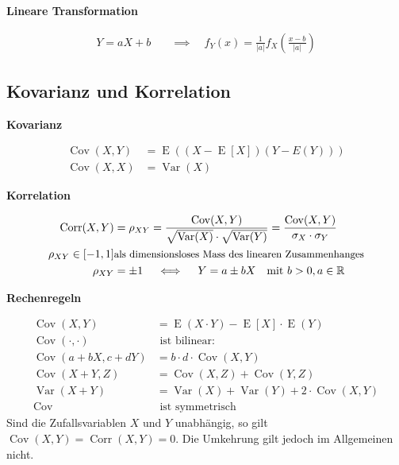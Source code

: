 \documentclass[25pt]{sciposter}
\newcommand{\R}{\mathbb{R}}
\newcommand{\Var}{\operatorname{Var}}
\newcommand{\E}{\operatorname{E}}
\newenvironment{method}[1]{\begin{mdframed}[backgroundcolor=blue!10,innertopmargin=15pt, innerbottommargin=15pt,nobreak=true]
		\textbf{#1 }
	}
	{ 
	\end{mdframed}
}
\newenvironment{thm}[1]{\begin{mdframed}[backgroundcolor=pink!20,innertopmargin=15pt, innerbottommargin=15pt, nobreak=true]
		\textbf{#1 }
	}
	{ 
	\end{mdframed}
}
\begin{document}
\begin{multicols}{3}
\begin{method}{{Lineare Transformation}}
\begin{align*}
Y = aX+b \quad &\implies \quad f_Y(x) = \tfrac{1}{|a|} f_X\left(\tfrac{x-b}{|a|}\right)
\end{align*}
\end{method}




\subsection*{Kovarianz und Korrelation}


\begin{method}{Kovarianz}
	\begin{align*}	
	\operatorname{Cov}(X,Y) &= \E\left(\left(X-\E[X]\right)\left(Y-E(Y)\right)\right) \\
	\operatorname{Cov}(X,X) &= \Var(X)
	\end{align*}
\end{method}

\begin{method}{Korrelation}
	\begin{align*}
	\operatorname{Corr}(X,Y) &= \rho_{XY} = \frac{\operatorname{Cov}(X,Y)}{\sqrt{\Var(X)} \cdot \sqrt{\Var(Y)}}
	= \frac{\operatorname{Cov}(X,Y)}{\sigma_X\cdot\sigma_Y} \\
	\rho_{XY} \in [-1,1] &  \text{\small als dimensionsloses Mass des linearen Zusammenhanges} \\
	\rho_{XY} &=\pm 1 \quad \iff \quad Y = a\pm bX \quad \text{mit }b>0, a \in \R
	\end{align*}
\end{method}

\begin{thm}{Rechenregeln}
	\begin{align*}
	\operatorname{Cov}(X,Y) &= \E(X\cdot Y) - \E[X] \cdot \E(Y) \\
	\operatorname{Cov}(\cdot,\cdot) &\text{ ist bilinear:} \quad \\
	\operatorname{Cov}(a+bX,c+dY) &= b\cdot d \cdot \operatorname{Cov} (X,Y) \\
	\operatorname{Cov}(X+Y,Z) &= \operatorname{Cov}(X,Z)+\operatorname{Cov}(Y,Z) \\
	\Var(X+Y) &= \Var(X)+\Var(Y)+2 \cdot \operatorname{Cov}(X,Y) \\
	\operatorname{Cov} &\text{ ist symmetrisch}
	\end{align*}
	Sind die Zufallsvariablen $X$ und $Y$ unabhängig, so gilt $\operatorname{Cov}(X,Y) = \operatorname{Corr}(X,Y) = 0$.
	Die Umkehrung gilt jedoch im Allgemeinen nicht.
\end{thm}




\end{multicols}
\end{document}
